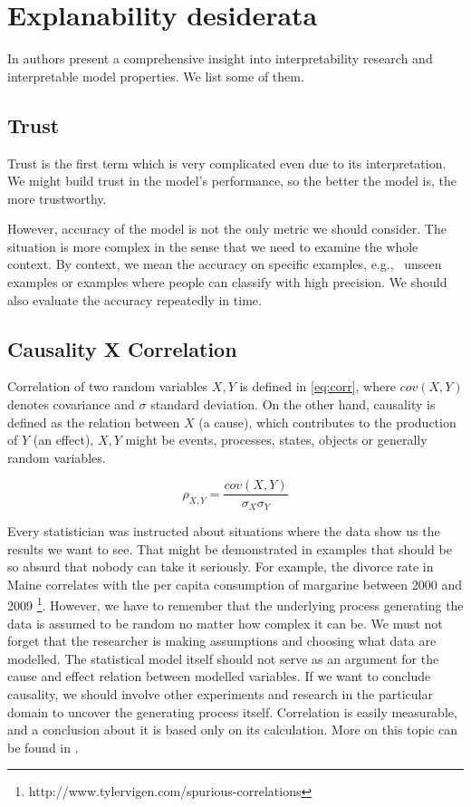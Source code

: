 \section{Explanability desiderata}
In \cite{Lipton2016} authors present a comprehensive insight into interpretability research and interpretable model properties. We list some of them.

\subsection{Trust}
Trust is the first term which is very complicated even due to its interpretation. We might build trust in the model's performance, so the better the model is, the more trustworthy. 

However, accuracy of the model is not the only metric we should consider. The situation is more complex in the sense that we need to examine the whole context. By context, we mean the accuracy on specific examples, e.g., \ unseen examples or examples where people can classify with high precision. We should also evaluate the accuracy repeatedly in time.

\subsection{Causality X Correlation}
Correlation of two random variables $X,Y$ is defined in \eqref{eq:corr}, where $cov(X,Y)$ denotes covariance and $\sigma$ standard deviation. On the other hand, causality is defined as the relation between $X$ (a cause), which contributes to the production of $Y$ (an effect), $X, Y$ might be events, processes, states, objects or generally random variables.

\begin{equation} \label{eq:corr}
    \rho_{X,Y}=\frac{cov(X,Y)}{\sigma_X\sigma_Y}
\end{equation}

Every statistician was instructed about situations where the data show us the results we want to see. That might be demonstrated in examples that should be so absurd that nobody can take it seriously. For example, the divorce rate in Maine correlates with the per capita consumption of margarine between 2000 and 2009 \footnote{http://www.tylervigen.com/spurious-correlations}. However, we have to remember that the underlying process generating the data is assumed to be random no matter how complex it can be. We must not forget that the researcher is making assumptions and choosing what data are modelled. The statistical model itself should not serve as an argument for the cause and effect relation between modelled variables. If we want to conclude causality, we should involve other experiments and research in the particular domain to uncover the generating process itself. Correlation is easily measurable, and a conclusion about it is based only on its calculation. More on this topic can be found in \cite{Kenny1979}.

